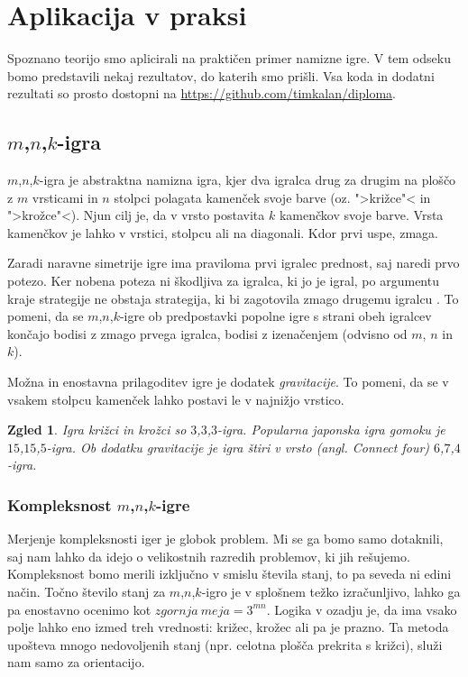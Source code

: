 \documentclass[12pt,a4paper]{amsart}
\theoremstyle{definition} %
\theoremstyle{plain} %
\newtheorem{zgled}[definicija]{Zgled}
\begin{document}
\section{Aplikacija v praksi}
Spoznano teorijo smo aplicirali na praktičen primer namizne igre. V tem odseku bomo predstavili 
nekaj rezultatov, do katerih smo prišli. Vsa koda in dodatni rezultati so prosto dostopni na 
\href{https://github.com/timkalan/diploma}{https://github.com/timkalan/diploma}.

\subsection{$m$,$n$,$k$-igra}
$m$,$n$,$k$-igra je abstraktna namizna igra, kjer dva igralca drug za drugim na ploščo z $m$ 
vrsticami in $n$ stolpci polagata kamenček svoje barve (oz. ">križce"< in ">krožce"<). Njun cilj 
je, da v vrsto postavita $k$ kamenčkov svoje barve. Vrsta kamenčkov je lahko v vrstici, stolpcu 
ali na diagonali. Kdor prvi uspe, zmaga. 

Zaradi naravne simetrije igre ima praviloma prvi igralec prednost, saj naredi prvo potezo. Ker nobena 
poteza ni škodljiva za igralca, ki jo je igral, po argumentu kraje strategije ne obstaja strategija, 
ki bi zagotovila zmago drugemu igralcu \cite{SSA}. To pomeni, da se $m$,$n$,$k$-igre ob predpostavki 
popolne igre s strani obeh igralcev končajo bodisi z zmago prvega igralca, bodisi z izenačenjem 
(odvisno od $m$, $n$ in $k$).

Možna in enostavna prilagoditev igre je dodatek \textit{gravitacije}. To pomeni, da se v vsakem
stolpcu kamenček lahko postavi le v najnižjo vrstico.

\begin{zgled}
    Igra križci in krožci so $3$,$3$,$3$-igra. Popularna japonska igra gomoku je 
    $15$,$15$,$5$-igra. Ob dodatku gravitacije je igra štiri v vrsto (angl. \textit{Connect four}) 
    $6$,$7$,$4$-igra.
\end{zgled}

\subsubsection{Kompleksnost $m$,$n$,$k$-igre}
Merjenje kompleksnosti iger je globok problem. Mi se ga bomo samo dotaknili, saj nam lahko da idejo 
o velikostnih razredih problemov, ki jih rešujemo. Kompleksnost bomo merili izključno v smislu števila 
stanj, to pa seveda ni edini način. Točno število stanj za $m$,$n$,$k$-igro je v splošnem težko 
izračunljivo, lahko ga pa enostavno ocenimo kot $zgornja~meja = 3 ^ {mn}$. Logika v ozadju je, 
da ima vsako polje lahko eno izmed treh vrednosti: križec, krožec ali pa je prazno. Ta metoda upošteva 
mnogo nedovoljenih stanj (npr. celotna plošča prekrita s križci), služi nam samo za orientacijo.
\end{document}

